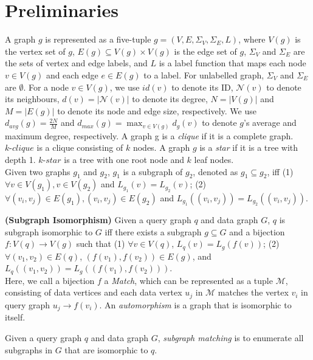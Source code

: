 \section{Preliminaries}
\label{sec:prelim}
A graph $g$ is represented as a five-tuple $g=(V, E, \Sigma_V,\Sigma_E, L)$, where $V(g)$ is the vertex set of $g$, $E(g) \subseteq V(g) \times V(g)$ is the edge set of $g$, $\Sigma_V$ and $\Sigma_E$ are the sets of vertex and edge labels, and $L$ is a label function that maps each node $v\in V(g)$ and each edge $e \in E(g)$ to a label. For unlabelled graph, $\Sigma_V$ and $\Sigma_E$ are $\emptyset$. For a node $v\in V(g)$, we use $id(v)$ to denote its ID, $\mathcal{N}(v)$ to denote its neighbours, $d(v)=|\mathcal{N}(v)|$ to denote its degree, $N=|V(g)|$ and  $M=|E(g)|$ to denote its node and edge size, respectively. We use $d_{avg}(g) = \frac{2N}{M}$ and $d_{max}(g) = \max_{v\in V(g)}d_g(v)$ to denote $g$'s average and maximum degree, respectively. A graph g is a \textit{clique} if it is a complete graph. $k\text{-}clique$ is a clique consisting of $k$ nodes. A graph $g$ is a \textit{star} if it is a tree with depth 1. $k\text{-}star$ is a tree with one root node and $k$ leaf nodes.\\

Given two graphs $g_1$ and $g_2$, $g_1$ is a subgraph of $g_2$, denoted as $g_1 \subseteq g_2$, iff (1) $\forall v\in V(g_1), v\in V(g_2)$ and $L_{g_1}(v)=L_{g_2}(v)$; (2) $\forall (v_i,v_j)\in E(g_1), (v_i,v_j)\in E(g_2)$ and $L_{g_1}((v_i,v_j))=L_{g_2}((v_i,v_j))$.\\

\begin{definition}
\label{def:isomorphism}{\textbf{(Subgraph Isomorphism)}} Given a query graph $q$ and data graph $G$, $q$ is subgraph isomorphic to $G$ iff there exists a subgraph $g\subseteq G$ and a bijection $f: V(q) \rightarrow V(g)$ such that (1) $\forall v \in V(q)$, $L_q(v) = L_{g}(f(v))$; (2) $\forall (v_1, v_2) \in E(q)$, $(f(v_1), f(v_2)) \in E(g)$, and $L_q((v_1, v_2)) = L_{g}((f(v_1), f(v_2)))$. \\

Here, we call a bijection $f$ a \textit{Match}, which can be represented as a tuple $\mathcal{M}$, consisting of data vertices and each data vertex $u_j$ in $\mathcal{M}$ matches the vertex $v_i$ in query graph $u_j \rightarrow f(v_i)$. An \textit{automorphism} is a graph that is isomorphic to itself.
\end{definition}

 Given a query graph $q$ and data graph $G$, \textit{subgraph matching} is to enumerate all subgraphs in $G$ that are isomorphic to $q$.\\

